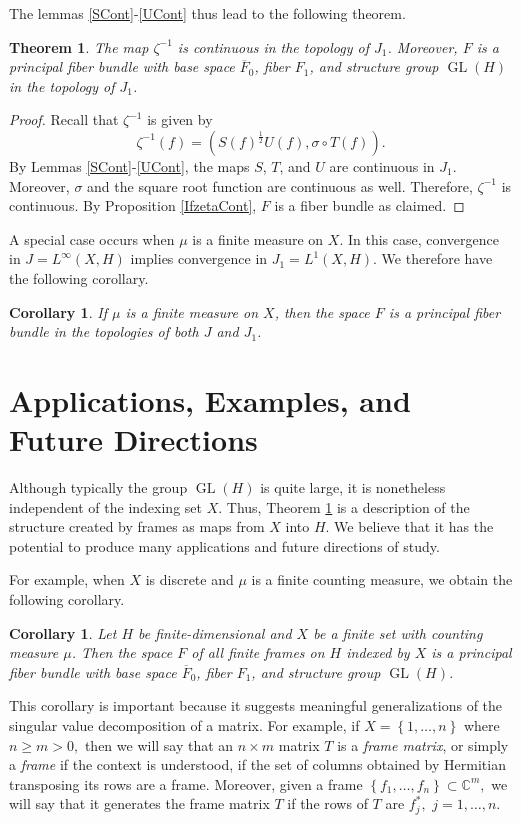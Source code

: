 \documentclass{article}
\newtheorem{thm}[defn]{Theorem}
\newtheorem{cor}[defn]{Corollary}
\newcommand{\GL}{\operatorname{GL}}
\newcommand{\Fbar}{\overline{F}}
\begin{document}
\noindent The lemmas \ref{SCont}-\ref{UCont} thus lead to the following theorem.
\begin{thm} \label{FiberBundle}
The map $\zeta^{-1}$ is continuous in the topology of $J_1$. Moreover, $F$ is a principal fiber bundle with base space $\Fbar_0$, fiber $F_1$, and structure group $\GL(H)$ in the topology of $J_1$.
\end{thm}
\begin{proof}
Recall that $\zeta^{-1}$ is given by
\[ \zeta^{-1}(f) = (S(f)^{\frac{1}{2}}U(f), \sigma\circ T(f)). \]
By Lemmas \ref{SCont}-\ref{UCont}, the maps $S$, $T$, and $U$ are continuous in $J_1$. Moreover, $\sigma$ and the square root function are continuous as well. Therefore, $\zeta^{-1}$ is continuous. By Proposition \ref{IfzetaCont}, $F$ is a fiber bundle as claimed.
\end{proof}

A special case occurs when $\mu$ is a finite measure on $X$. In this case, convergence in $J=L^\infty(X,H)$ implies convergence in $J_1=L^1(X,H)$. We therefore have the following corollary.

\begin{cor} \label{FiniteMeasure}
If $\mu$ is a finite measure on $X$, then the space $F$ is a principal fiber bundle in the topologies of both $J$ and $J_1$.
\end{cor}


\section{Applications, Examples, and Future Directions}

Although typically the group $\GL(H)$ is quite large, it is nonetheless independent of the indexing set $X$.  Thus, Theorem \ref{FiberBundle} is a description of the structure created by frames as maps from $X$ into $H.$   We believe that it has the potential to produce many applications and future directions of study.  

For example, when $X$ is discrete and $\mu$ is a finite counting measure, we obtain the following corollary.
\begin{cor}
Let $H$ be finite-dimensional and $X$ be a finite set with counting measure $\mu$. Then the space $F$ of all finite frames on $H$ indexed by $X$ is a principal fiber bundle with base space $\Fbar_0$, fiber $F_1$, and structure group $\GL(H)$.
\end{cor}

This corollary is important because it suggests meaningful generalizations of the singular value decomposition of a matrix.  For example, if $X=\left\{ 1,\ldots ,n\right\} $ where $n\geq m>0,$ then we will say that an $n\times m$ matrix $T$ is a \emph{frame matrix}, or simply a \emph{frame} if the context is understood, if the set of columns obtained by Hermitian transposing its rows are a frame.  Moreover, given a frame $\left\{ f_{1},\ldots,f_{n}\right\} \subset \mathbb{C}^{m},$ we will say that it generates the frame matrix $T$ if the rows of $T$ are  $f_{j}^{\ast },$ $j=1,\ldots ,n.$ 
\end{document}
